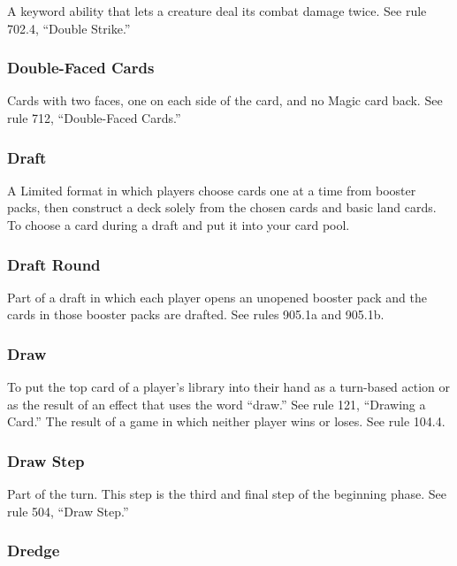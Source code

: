 {{{{{{{A keyword ability that lets a creature deal its combat damage twice. See rule 702.4, “Double Strike.”

\subsubsection*{Double-Faced Cards}

Cards with two faces, one on each side of the card, and no Magic card back. See rule 712, “Double-Faced Cards.”

\subsubsection*{Draft}

A Limited format in which players choose cards one at a time from booster packs, then construct a deck solely from the chosen cards and basic land cards.
To choose a card during a draft and put it into your card pool.

\subsubsection*{Draft Round}

Part of a draft in which each player opens an unopened booster pack and the cards in those booster packs are drafted. See rules 905.1a and 905.1b.

\subsubsection*{Draw}

To put the top card of a player’s library into their hand as a turn-based action or as the result of an effect that uses the word “draw.” See rule 121, “Drawing a Card.”
The result of a game in which neither player wins or loses. See rule 104.4.

\subsubsection*{Draw Step}

Part of the turn. This step is the third and final step of the beginning phase. See rule 504, “Draw Step.”

\subsubsection*{Dredge}

}}}}}}}
